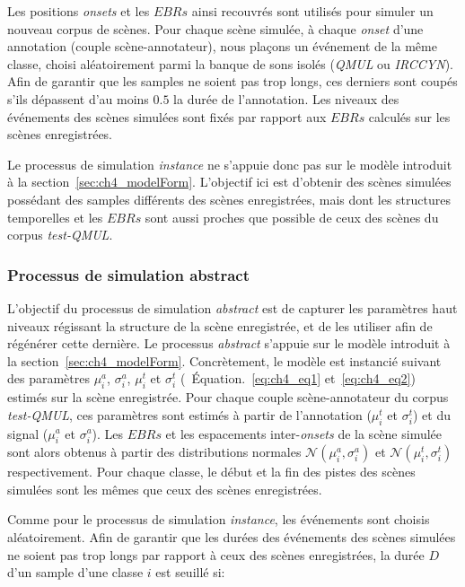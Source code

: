 Les positions \emph{onsets} et les $EBRs$ ainsi recouvrés sont utilisés pour simuler un nouveau corpus de scènes. Pour chaque scène simulée, à chaque \emph{onset} d'une annotation (couple scène-annotateur), nous plaçons un événement de la même classe, choisi aléatoirement parmi la banque de sons isolés (\emph{QMUL} ou \emph{IRCCYN}). Afin de garantir que les samples ne soient pas trop longs, ces derniers sont coupés s'ils dépassent d'au moins $0.5$ la durée de l'annotation. Les niveaux des événements des scènes simulées sont fixés par rapport aux $EBRs$ calculés sur les scènes enregistrées. 

Le processus de simulation \emph{instance} ne s'appuie donc pas sur le modèle introduit à la section~\ref{sec:ch4_modelForm}. L'objectif ici est d’obtenir des scènes simulées possédant des samples différents des scènes enregistrées, mais dont les structures temporelles et les $EBRs$ sont aussi proches que possible de ceux des scènes du corpus \emph{test-QMUL}.

\subsubsection{Processus de simulation abstract}
\label{sec:ch7_simuProcessAbstract}

L'objectif du processus de simulation \emph{abstract} est de capturer les paramètres haut niveaux régissant la structure de la scène enregistrée, et de les utiliser afin de régénérer cette dernière. Le processus \emph{abstract} s'appuie sur le modèle introduit à la section~\ref{sec:ch4_modelForm}. Concrètement, le modèle est instancié suivant des paramètres $\mu_i^a$, $\sigma_i^a$, $\mu_i^t$ et $\sigma_i^t$ (\cf~Équation.~\ref{eq:ch4_eq1} et~\ref{eq:ch4_eq2}) estimés sur la scène enregistrée. Pour chaque couple scène-annotateur du corpus \emph{test-QMUL}, ces paramètres sont estimés à partir de l'annotation ($\mu_i^t$ et $\sigma_i^t$) et du signal ($\mu_i^a$ et $\sigma_i^a$). Les $EBRs$ et les espacements inter-\emph{onsets} de la scène simulée sont alors obtenus à partir des distributions normales $\mathcal{N}(\mu_i^a,\sigma_i^a)$ et $\mathcal{N}(\mu_i^t,\sigma_i^t)$ respectivement. Pour chaque classe, le début et la fin des pistes des scènes simulées sont les mêmes que ceux des scènes enregistrées.

Comme pour le processus de simulation \emph{instance}, les événements sont choisis aléatoirement. Afin de garantir que les durées des événements des scènes simulées ne soient pas trop longs par rapport à ceux des scènes enregistrées, la durée $D$ d'un sample d'une classe $i$ est seuillé si:

